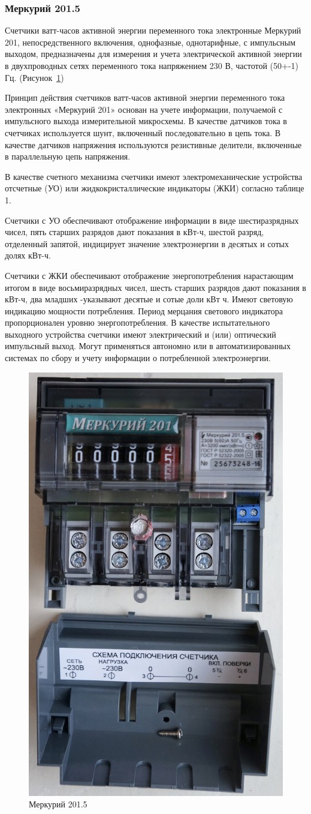 \subsubsection{Меркурий 201.5}

Счетчики ватт-часов активной энергии переменного тока электронные Меркурий 201, непосредственного включения, однофазные, однотарифные, с импульсным выходом, предназначены для измерения и учета электрической активной энергии в двухпроводных сетях переменного тока напряжением 230 В, частотой (50+-1) Гц. (Рисунок~\ref{fig:mercuriy})

Принцип действия счетчиков ватт-часов активной энергии переменного тока электронных «Меркурий 201» основан на учете информации, получаемой с импульсного выхода измерительной микросхемы. В качестве датчиков тока в счетчиках используется шунт, включенный последовательно в цепь тока. В качестве датчиков напряжения используются резистивные делители, включенные в параллельную цепь напряжения. \cite{incotexcom}

В качестве счетного механизма счетчики имеют электромеханические устройства отсчетные (УО) или жидкокристаллические индикаторы (ЖКИ) согласно таблице 1.

Счетчики с УО обеспечивают отображение информации в виде шестиразрядных чисел, пять старших разрядов дают показания в кВт-ч, шестой разряд, отделенный запятой, индицирует значение электроэнергии в десятых и сотых долях кВт-ч.

Счетчики с ЖКИ обеспечивают отображение энергопотребления нарастающим итогом в виде восьмиразрядных чисел, шесть старших разрядов дают показания в кВт-ч, два младших -указывают десятые и сотые доли кВт ч. Имеют световую индикацию мощности потребления. Период мерцания светового индикатора пропорционален уровню энергопотребления. В качестве испытательного выходного устройства счетчики имеют электрический и (или) оптический импульсный выход. Могут применяться автономно или в автоматизированных системах по сбору и учету информации о потребленной электроэнергии.  

\begin{figure}[H]
	\centering
	\includegraphics[width=0.5\linewidth]{pics/mercuriy}
	\caption{Меркурий 201.5}
	\label{fig:mercuriy}
\end{figure}